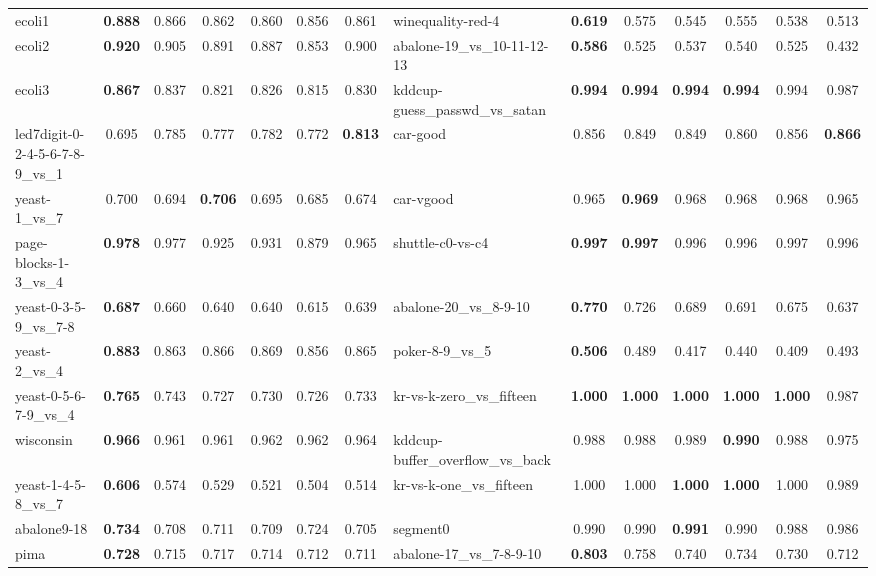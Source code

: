 \begin{table}[t]
\begin{tabular}{@{}lcccccc@{\hspace{12pt}}lcccccc@{}}
ecoli1 & \textbf{0.888} & 0.866 & 0.862 & 0.860 & 0.856 & 0.861 & winequality-red-4 & \textbf{0.619} & 0.575 & 0.545 & 0.555 & 0.538 & 0.513 \\
ecoli2 & \textbf{0.920} & 0.905 & 0.891 & 0.887 & 0.853 & 0.900 & abalone-19\_vs\_10-11-12-13 & \textbf{0.586} & 0.525 & 0.537 & 0.540 & 0.525 & 0.432 \\
ecoli3 & \textbf{0.867} & 0.837 & 0.821 & 0.826 & 0.815 & 0.830 & kddcup-guess\_passwd\_vs\_satan & \textbf{0.994} & \textbf{0.994} & \textbf{0.994} & \textbf{0.994} & 0.994 & 0.987 \\
led7digit-0-2-4-5-6-7-8-9\_vs\_1 & 0.695 & 0.785 & 0.777 & 0.782 & 0.772 & \textbf{0.813} & car-good & 0.856 & 0.849 & 0.849 & 0.860 & 0.856 & \textbf{0.866} \\
yeast-1\_vs\_7 & 0.700 & 0.694 & \textbf{0.706} & 0.695 & 0.685 & 0.674 & car-vgood & 0.965 & \textbf{0.969} & 0.968 & 0.968 & 0.968 & 0.965 \\
page-blocks-1-3\_vs\_4 & \textbf{0.978} & 0.977 & 0.925 & 0.931 & 0.879 & 0.965 & shuttle-c0-vs-c4 & \textbf{0.997} & \textbf{0.997} & 0.996 & 0.996 & 0.997 & 0.996 \\
yeast-0-3-5-9\_vs\_7-8 & \textbf{0.687} & 0.660 & 0.640 & 0.640 & 0.615 & 0.639 & abalone-20\_vs\_8-9-10 & \textbf{0.770} & 0.726 & 0.689 & 0.691 & 0.675 & 0.637 \\
yeast-2\_vs\_4 & \textbf{0.883} & 0.863 & 0.866 & 0.869 & 0.856 & 0.865 & poker-8-9\_vs\_5 & \textbf{0.506} & 0.489 & 0.417 & 0.440 & 0.409 & 0.493 \\
yeast-0-5-6-7-9\_vs\_4 & \textbf{0.765} & 0.743 & 0.727 & 0.730 & 0.726 & 0.733 & kr-vs-k-zero\_vs\_fifteen & \textbf{1.000} & \textbf{1.000} & \textbf{1.000} & \textbf{1.000} & \textbf{1.000} & 0.987 \\
wisconsin & \textbf{0.966} & 0.961 & 0.961 & 0.962 & 0.962 & 0.964 & kddcup-buffer\_overflow\_vs\_back & 0.988 & 0.988 & 0.989 & \textbf{0.990} & 0.988 & 0.975 \\
yeast-1-4-5-8\_vs\_7 & \textbf{0.606} & 0.574 & 0.529 & 0.521 & 0.504 & 0.514 & kr-vs-k-one\_vs\_fifteen & 1.000 & 1.000 & \textbf{1.000} & \textbf{1.000} & 1.000 & 0.989 \\
abalone9-18 & \textbf{0.734} & 0.708 & 0.711 & 0.709 & 0.724 & 0.705 & segment0 & 0.990 & 0.990 & \textbf{0.991} & 0.990 & 0.988 & 0.986 \\
pima & \textbf{0.728} & 0.715 & 0.717 & 0.714 & 0.712 & 0.711 & abalone-17\_vs\_7-8-9-10 & \textbf{0.803} & 0.758 & 0.740 & 0.734 & 0.730 & 0.712 \\

\end{tabular}
\end{table}
